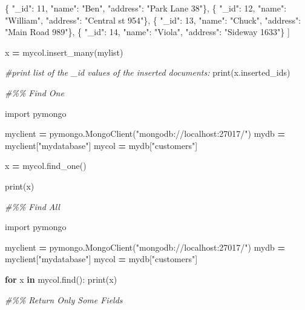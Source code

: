 \documentclass[
]{book}
\newenvironment{Shaded}{\begin{snugshade}}{\end{snugshade}}
\newcommand{\BuiltInTok}[1]{#1}
\newcommand{\CommentTok}[1]{\textcolor[rgb]{0.56,0.35,0.01}{\textit{#1}}}
\newcommand{\ControlFlowTok}[1]{\textcolor[rgb]{0.13,0.29,0.53}{\textbf{#1}}}
\newcommand{\DecValTok}[1]{\textcolor[rgb]{0.00,0.00,0.81}{#1}}
\newcommand{\ImportTok}[1]{#1}
\newcommand{\KeywordTok}[1]{\textcolor[rgb]{0.13,0.29,0.53}{\textbf{#1}}}
\newcommand{\NormalTok}[1]{#1}
\newcommand{\OperatorTok}[1]{\textcolor[rgb]{0.81,0.36,0.00}{\textbf{#1}}}
\newcommand{\StringTok}[1]{\textcolor[rgb]{0.31,0.60,0.02}{#1}}
\begin{document}
\begin{Shaded}
\begin{Highlighting}[]
\NormalTok{  \{ }\StringTok{"\_id"}\NormalTok{: }\DecValTok{11}\NormalTok{, }\StringTok{"name"}\NormalTok{: }\StringTok{"Ben"}\NormalTok{, }\StringTok{"address"}\NormalTok{: }\StringTok{"Park Lane 38"}\NormalTok{\},}
\NormalTok{  \{ }\StringTok{"\_id"}\NormalTok{: }\DecValTok{12}\NormalTok{, }\StringTok{"name"}\NormalTok{: }\StringTok{"William"}\NormalTok{, }\StringTok{"address"}\NormalTok{: }\StringTok{"Central st 954"}\NormalTok{\},}
\NormalTok{  \{ }\StringTok{"\_id"}\NormalTok{: }\DecValTok{13}\NormalTok{, }\StringTok{"name"}\NormalTok{: }\StringTok{"Chuck"}\NormalTok{, }\StringTok{"address"}\NormalTok{: }\StringTok{"Main Road 989"}\NormalTok{\},}
\NormalTok{  \{ }\StringTok{"\_id"}\NormalTok{: }\DecValTok{14}\NormalTok{, }\StringTok{"name"}\NormalTok{: }\StringTok{"Viola"}\NormalTok{, }\StringTok{"address"}\NormalTok{: }\StringTok{"Sideway 1633"}\NormalTok{\}}
\NormalTok{]}

\NormalTok{x }\OperatorTok{=}\NormalTok{ mycol.insert\_many(mylist)}

\CommentTok{\#print list of the \_id values of the inserted documents:}
\BuiltInTok{print}\NormalTok{(x.inserted\_ids)}

\CommentTok{\#\%\% Find One}

\ImportTok{import}\NormalTok{ pymongo}

\NormalTok{myclient }\OperatorTok{=}\NormalTok{ pymongo.MongoClient(}\StringTok{"mongodb://localhost:27017/"}\NormalTok{)}
\NormalTok{mydb }\OperatorTok{=}\NormalTok{ myclient[}\StringTok{"mydatabase"}\NormalTok{]}
\NormalTok{mycol }\OperatorTok{=}\NormalTok{ mydb[}\StringTok{"customers"}\NormalTok{]}

\NormalTok{x }\OperatorTok{=}\NormalTok{ mycol.find\_one()}

\BuiltInTok{print}\NormalTok{(x)}

\CommentTok{\#\%\% Find All}


\ImportTok{import}\NormalTok{ pymongo}

\NormalTok{myclient }\OperatorTok{=}\NormalTok{ pymongo.MongoClient(}\StringTok{"mongodb://localhost:27017/"}\NormalTok{)}
\NormalTok{mydb }\OperatorTok{=}\NormalTok{ myclient[}\StringTok{"mydatabase"}\NormalTok{]}
\NormalTok{mycol }\OperatorTok{=}\NormalTok{ mydb[}\StringTok{"customers"}\NormalTok{]}

\ControlFlowTok{for}\NormalTok{ x }\KeywordTok{in}\NormalTok{ mycol.find():}
  \BuiltInTok{print}\NormalTok{(x)}
  
\CommentTok{\#\%\% Return Only Some Fields}


\end{Highlighting}
\end{Shaded}
\end{document}
